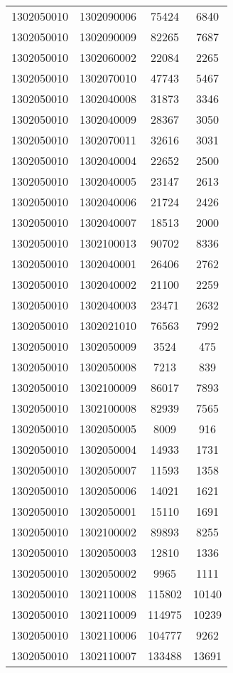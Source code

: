 \begin{longtable}[h]{llcc}
		1302050010 & 1302090006 & 75424 & 6840\\
		1302050010 & 1302090009 & 82265 & 7687\\
		1302050010 & 1302060002 & 22084 & 2265\\
		1302050010 & 1302070010 & 47743 & 5467\\
		1302050010 & 1302040008 & 31873 & 3346\\
		1302050010 & 1302040009 & 28367 & 3050\\
		1302050010 & 1302070011 & 32616 & 3031\\
		1302050010 & 1302040004 & 22652 & 2500\\
		1302050010 & 1302040005 & 23147 & 2613\\
		1302050010 & 1302040006 & 21724 & 2426\\
		1302050010 & 1302040007 & 18513 & 2000\\
		1302050010 & 1302100013 & 90702 & 8336\\
		1302050010 & 1302040001 & 26406 & 2762\\
		1302050010 & 1302040002 & 21100 & 2259\\
		1302050010 & 1302040003 & 23471 & 2632\\
		1302050010 & 1302021010 & 76563 & 7992\\
		1302050010 & 1302050009 & 3524 & 475\\
		1302050010 & 1302050008 & 7213 & 839\\
		1302050010 & 1302100009 & 86017 & 7893\\
		1302050010 & 1302100008 & 82939 & 7565\\
		1302050010 & 1302050005 & 8009 & 916\\
		1302050010 & 1302050004 & 14933 & 1731\\
		1302050010 & 1302050007 & 11593 & 1358\\
		1302050010 & 1302050006 & 14021 & 1621\\
		1302050010 & 1302050001 & 15110 & 1691\\
		1302050010 & 1302100002 & 89893 & 8255\\
		1302050010 & 1302050003 & 12810 & 1336\\
		1302050010 & 1302050002 & 9965 & 1111\\
		1302050010 & 1302110008 & 115802 & 10140\\
		1302050010 & 1302110009 & 114975 & 10239\\
		1302050010 & 1302110006 & 104777 & 9262\\
		1302050010 & 1302110007 & 133488 & 13691\\

\end{longtable}
